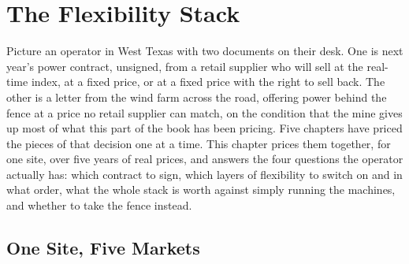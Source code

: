 \chapter{The Flexibility Stack}
\label{ch:stack}

Picture an operator in West Texas with two documents on their desk. One is next year's power contract, unsigned, from a retail supplier who will sell at the real-time index, at a fixed price, or at a fixed price with the right to sell back. The other is a letter from the wind farm across the road, offering power behind the fence at a price no retail supplier can match, on the condition that the mine gives up most of what this part of the book has been pricing. Five chapters have priced the pieces of that decision one at a time. This chapter prices them together, for one site, over five years of real prices, and answers the four questions the operator actually has: which contract to sign, which layers of flexibility to switch on and in what order, what the whole stack is worth against simply running the machines, and whether to take the fence instead.

\section{One Site, Five Markets}
\label{sec:stack-site}

